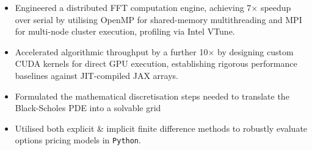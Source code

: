 \documentclass{cv}
\begin{document}
\begin{subsections}
    \begin{itemize}[leftmargin=!, itemindent=-1em]
        \item Engineered a distributed FFT computation engine, achieving 7$\times$ speedup over serial by utilising OpenMP for shared-memory multithreading and MPI for multi-node cluster execution, profiling via Intel VTune.
        \item Accelerated algorithmic throughput by a further 10$\times$ by designing custom CUDA kernels for direct GPU execution, establishing rigorous performance baselines against JIT-compiled JAX arrays.
    \end{itemize}

    \begin{itemize}[leftmargin=!, itemindent=-1em]
        \item Formulated the mathematical discretisation steps needed to translate the Black-Scholes PDE into a solvable grid
        \item Utilised both explicit \& implicit finite difference methods to robustly evaluate options pricing models in \verb|Python|.
    \end{itemize}
\end{subsections}
\end{document}
